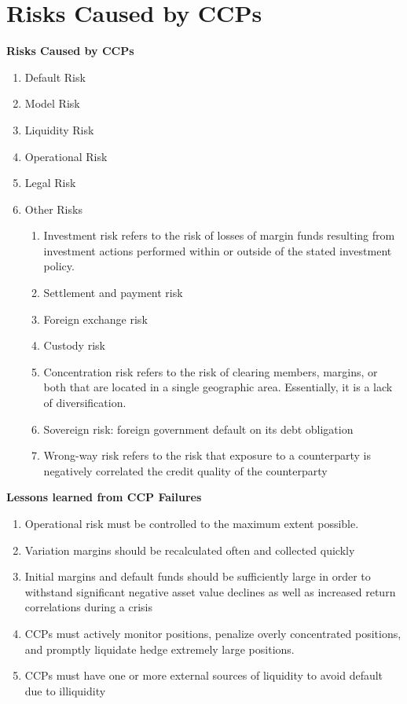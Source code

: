 \documentclass[11pt,fleqn]{book} %
\numberwithin{equation}{section} %
\numberwithin{figure}{section} %
\numberwithin{table}{section} %
\begin{document}
\chapter{Risks Caused by CCPs}
 \begin{definition}\textbf{Risks Caused by CCPs}
 \begin{enumerate}
     \item Default Risk
     \item Model Risk
     \item Liquidity Risk
     \item Operational Risk
     \item Legal Risk
     \item Other Risks
     \begin{enumerate}
         \item Investment risk refers to the risk of losses of margin funds resulting from investment actions performed within or outside of the stated investment policy.
         \item Settlement and payment risk
         \item Foreign exchange risk
         \item Custody risk
         \item Concentration risk refers to the risk of clearing members, margins, or both that are located in a single geographic area. Essentially, it is a lack of diversification.
         \item Sovereign risk: foreign government default on its debt obligation
         \item Wrong-way risk refers to the risk that exposure to a counterparty is negatively correlated the credit quality of the counterparty
     \end{enumerate}
 \end{enumerate}
 \end{definition}
 \begin{definition}\textbf{Lessons learned from CCP Failures}
     \begin{enumerate}
         \item Operational risk must be controlled to the maximum extent possible.
         \item Variation margins should be recalculated often and collected quickly
         \item Initial margins and default funds should be sufficiently large in order to withstand significant negative asset value declines as well as increased return correlations during a crisis
         \item CCPs must actively monitor positions, penalize overly concentrated positions, and promptly liquidate hedge extremely large positions.
         \item CCPs must have one or more external sources of liquidity to avoid default due to illiquidity
     \end{enumerate}
     \end{definition}
\end{document}
